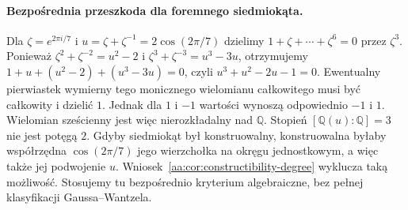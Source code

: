 \paragraph{Bezpośrednia przeszkoda dla foremnego siedmiokąta.}
Dla $\zeta=e^{2\pi i/7}$ i $u=\zeta+\zeta^{-1}=2\cos(2\pi/7)$
dzielimy $1+\zeta+\cdots+\zeta^6=0$ przez $\zeta^3$.
Ponieważ $\zeta^2+\zeta^{-2}=u^2-2$ i
$\zeta^3+\zeta^{-3}=u^3-3u$, otrzymujemy
$1+u+(u^2-2)+(u^3-3u)=0$, czyli $u^3+u^2-2u-1=0$.
Ewentualny pierwiastek wymierny tego monicznego
wielomianu całkowitego musi być całkowity i dzielić $1$.
Jednak dla $1$ i $-1$ wartości wynoszą odpowiednio
$-1$ i $1$. Wielomian sześcienny jest więc nierozkładalny
nad $\mathbb Q$. Stopień $[\mathbb Q(u):\mathbb Q]=3$
nie jest potęgą $2$. Gdyby siedmiokąt był konstruowalny,
konstruowalna byłaby współrzędna $\cos(2\pi/7)$ jego
wierzchołka na okręgu jednostkowym, a więc także jej
podwojenie $u$. Wniosek~\ref{aa:cor:constructibility-degree}
wyklucza taką możliwość. Stosujemy tu bezpośrednio
kryterium algebraiczne, bez pełnej klasyfikacji Gaussa--Wantzela.

